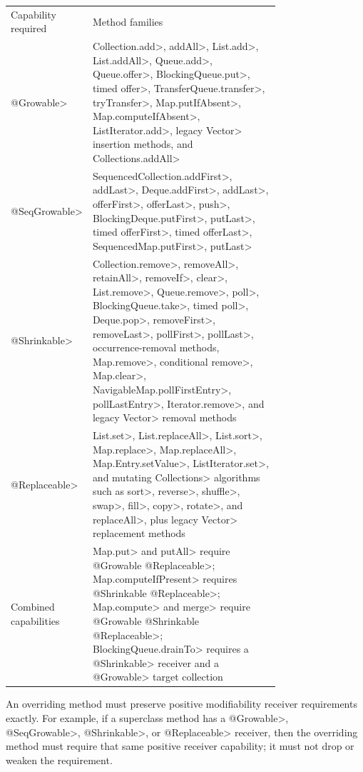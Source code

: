 \noindent
\begin{tabular}{lp{0.75\linewidth}}
Capability required & Method families \\
\<@Growable> &
  \<Collection.add>, \<addAll>, \<List.add>,
  \<List.addAll>, \<Queue.add>, \<Queue.offer>, \<BlockingQueue.put>,
  timed \<offer>, \<TransferQueue.transfer>, \<tryTransfer>,
  \<Map.putIfAbsent>, \<Map.computeIfAbsent>, \<ListIterator.add>,
  legacy \<Vector> insertion methods, and \<Collections.addAll> \\
\<@SeqGrowable> &
  \<SequencedCollection.addFirst>, \<addLast>, \<Deque.addFirst>,
  \<addLast>, \<offerFirst>, \<offerLast>, \<push>,
  \<BlockingDeque.putFirst>, \<putLast>, timed \<offerFirst>,
  timed \<offerLast>, \<SequencedMap.putFirst>, \<putLast> \\
\<@Shrinkable> &
  \<Collection.remove>, \<removeAll>, \<retainAll>,
  \<removeIf>, \<clear>, \<List.remove>, \<Queue.remove>, \<poll>,
  \<BlockingQueue.take>, timed \<poll>, \<Deque.pop>, \<removeFirst>,
  \<removeLast>, \<pollFirst>, \<pollLast>, occurrence-removal methods,
  \<Map.remove>, conditional \<remove>, \<Map.clear>,
  \<NavigableMap.pollFirstEntry>, \<pollLastEntry>, \<Iterator.remove>,
  and legacy \<Vector> removal methods \\
\<@Replaceable> &
  \<List.set>, \<List.replaceAll>,
  \<List.sort>, \<Map.replace>, \<Map.replaceAll>,
  \<Map.Entry.setValue>, \<ListIterator.set>, and mutating
  \<Collections> algorithms such as \<sort>, \<reverse>, \<shuffle>,
  \<swap>, \<fill>, \<copy>, \<rotate>, and \<replaceAll>, plus
  legacy \<Vector> replacement methods \\
Combined capabilities &
  \<Map.put> and \<putAll> require \<@Growable @Replaceable>;
  \<Map.computeIfPresent> requires \<@Shrinkable @Replaceable>;
  \<Map.compute> and \<merge> require
  \<@Growable @Shrinkable @Replaceable>;
  \<BlockingQueue.drainTo> requires a \<@Shrinkable> receiver and a
  \<@Growable> target collection \\
\end{tabular}

An overriding method must preserve positive modifiability receiver
requirements exactly.  For example, if a superclass method has a
\<@Growable>, \<@SeqGrowable>, \<@Shrinkable>, or \<@Replaceable> receiver,
then the overriding method must require that same positive receiver
capability; it must not drop or weaken the requirement.


